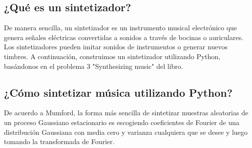 \documentclass[a4paper]{article}
\begin{document}
\subsection{\sffamily ¿Qué es un sintetizador?}
\noindent De manera sencilla, un sintetizador es un instrumento musical electrónico que genera señales eléctricas convertidas a sonidos a través de bocinas o auriculares. Los sintetizadores pueden imitar sonidos de instrumentos o generar nuevos timbres. A continuación, construimos un sintetizador utilizando Python, basándonos en el problema 3 "Synthesizing music" del libro.\\

\subsection{\sffamily ¿Cómo sintetizar música utilizando Python?}
\noindent De acuerdo a Mumford, la forma más sencilla de sintetizar muestras aleatorias de un proceso Gaussiano estacionario es escogiendo coeficientes de Fourier de una distribución Gaussiana con media cero y varianza cualquiera que se desee y luego tomando la transformada de Fourier.
\end{document}
